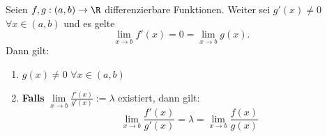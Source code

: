 Seien $f, g : (a, b) \to \R$ differenzierbare Funktionen. Weiter sei $g'(x) \neq 0$ $\forall x \in (a, b)$ und es gelte
$$\lim_{x \to b} f'(x) = 0 = \lim_{x \to b} g(x).$$
Dann gilt:
\begin{enumerate}
    \item $g(x) \neq 0$ $\forall x \in (a, b)$
    \item \textbf{Falls} $\lim\limits_{x \to b} \frac{f'(x)}{g'(x)} := \lambda$ existiert, dann gilt:
    $$\lim_{x \to b} \frac{f'(x)}{g'(x)} = \lambda = \lim_{x \to b} \frac{f(x)}{g(x)}$$
\end{enumerate}
